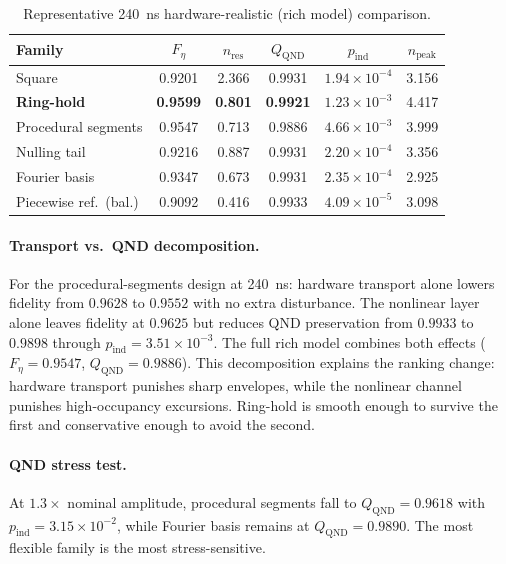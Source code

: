 \documentclass[aps,pra,twocolumn,reprint,amsmath,amssymb]{revtex4-2}
\begin{document}
\begin{table}[tp]
\centering
\caption{Representative \SI{240}{ns} hardware-realistic (rich model) comparison.}
\small
\begin{tabular}{@{} l c c c c c @{}}
\toprule
Family & $F_\eta$ & $n_\mathrm{res}$ & $Q_\mathrm{QND}$ & $p_\mathrm{ind}$ & $n_\mathrm{peak}$ \\
\midrule
Square & 0.9201 & 2.366 & 0.9931 & $1.94\times 10^{-4}$ & 3.156 \\
\textbf{Ring-hold} & \textbf{0.9599} & \textbf{0.801} & \textbf{0.9921} & $1.23\times 10^{-3}$ & 4.417 \\
Procedural segments & 0.9547 & 0.713 & 0.9886 & $4.66\times 10^{-3}$ & 3.999 \\
Nulling tail & 0.9216 & 0.887 & 0.9931 & $2.20\times 10^{-4}$ & 3.356 \\
Fourier basis & 0.9347 & 0.673 & 0.9931 & $2.35\times 10^{-4}$ & 2.925 \\
Piecewise ref.\ (bal.) & 0.9092 & 0.416 & 0.9933 & $4.09\times 10^{-5}$ & 3.098 \\
\bottomrule
\end{tabular}
\normalsize
\label{tab:level2_comparison}
\end{table}

\paragraph{Transport vs.\ QND decomposition.}
For the procedural-segments design at \SI{240}{ns}: hardware transport alone lowers fidelity from $0.9628$ to $0.9552$ with no extra disturbance. The nonlinear layer alone leaves fidelity at $0.9625$ but reduces QND preservation from $0.9933$ to $0.9898$ through $p_\mathrm{ind}=3.51\times 10^{-3}$. The full rich model combines both effects ($F_\eta=0.9547$, $Q_\mathrm{QND}=0.9886$). This decomposition explains the ranking change: hardware transport punishes sharp envelopes, while the nonlinear channel punishes high-occupancy excursions. Ring-hold is smooth enough to survive the first and conservative enough to avoid the second.

\paragraph{QND stress test.}
At $1.3\times$ nominal amplitude, procedural segments fall to $Q_\mathrm{QND}=0.9618$ with $p_\mathrm{ind}=3.15\times 10^{-2}$, while Fourier basis remains at $Q_\mathrm{QND}=0.9890$. The most flexible family is the most stress-sensitive.
\end{document}
